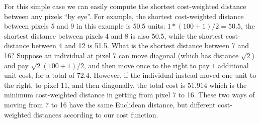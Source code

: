 For this simple case we 
 can easily compute the shortest cost-weighted distance between any
pixels ``by eye''.  For example, the shortest cost-weighted distance between
pixels 5 and 9 in this example is 50.5 units: $1*(100+1)/2 = 50.5$,
the shortest distance between pixels 4 and 8 is also 50.5, while the
shortest cost-distance between 4 and 12 is 51.5.  What is the shortest
distance between 7 and 16? Suppose an individual at pixel 7 can move
diagonal (which has distance $\sqrt{2}$) and pay $\sqrt{2}(100+1)/2$,
and then move once to the right to pay $1$ additional unit cost, for a
total of $72.4$. However, if the individual instead moved one unit to
the right, to pixel 11, and then diagonally, the total cost is
$51.914$ which is the minimum cost-weighted distance in getting from
pixel 7 to 16. These two ways of moving from 7 to 16 have the same
Euclidean distance, but different cost-weighted distances according to
our cost function.

